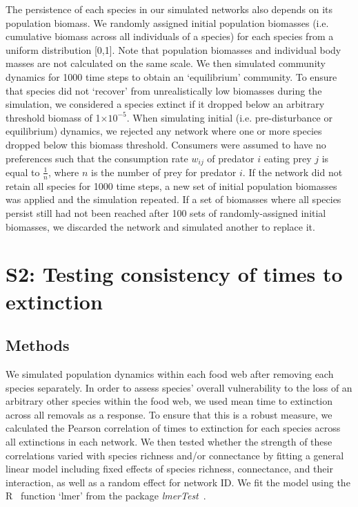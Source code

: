 \documentclass[12pt]{article}
\begin{document}
\begin{spacing}{2.0}
	
	The persistence of each species in our simulated networks also depends on its population biomass. 
	We randomly assigned initial population biomasses (i.e. cumulative biomass across all individuals of a species) for each species from a uniform distribution [0,1]. Note that population biomasses and individual body masses are not calculated on the same scale. We then simulated community dynamics for 1000 time steps to obtain an `equilibrium' community. To ensure that species did not `recover' from unrealistically low biomasses during the simulation, we considered a species extinct if it dropped below an arbitrary threshold biomass of 1$\times10^{-5}$. When simulating initial (i.e. pre-disturbance or equilibrium) dynamics, we rejected any network where one or more species dropped below this biomass threshold. Consumers were assumed to have no preferences such that the consumption rate $w_{ij}$ of predator $i$ eating prey $j$ is equal to $\frac{1}{n}$, where $n$ is the number of prey for predator $i$. If the network did not retain all species for 1000 time steps, a new set of initial population biomasses was applied and the simulation repeated.
	If a set of biomasses where all species persist still had not been reached after 100 sets of randomly-assigned initial biomasses, we discarded the network and simulated another to replace it.

\clearpage


\section*{S2: Testing consistency of times to extinction}

	\subsection*{Methods}

		We simulated population dynamics within each food web after removing each species separately. 
		In order to assess species' overall vulnerability to the loss of an arbitrary other species within the food web, we used mean time to extinction across all removals as a response. 
		To ensure that this is a robust measure, we calculated the Pearson correlation of times to extinction for each species across all extinctions in each network. 
		We then tested whether the strength of these correlations varied with species richness and/or connectance by fitting a general linear model including fixed effects of species richness, connectance, and their interaction, as well as a random effect for network ID. 
		We fit the model using the R~\citep{R} function `lmer' from the package \emph{lmerTest}~\citep{lmerTest}.



\end{spacing}
\end{document}
